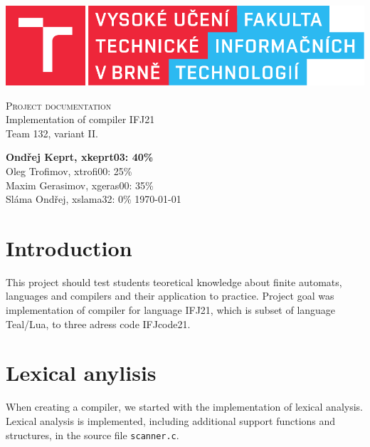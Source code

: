 \documentclass[11pt]{article}
\begin{document}
\begin{titlepage}
    \begin{center}
        \includegraphics[scale=0.8]{pics/fitlogo.pdf} \\

        
        \textsc{\Huge Project documentation}\\
        \LARGE
            Implementation of compiler IFJ21    \\
            Team 132, variant II.
    \end{center}

    \noindent\textbf{Ondřej Keprt, xkeprt03: 40\%}\\
    Oleg Trofimov, xtrofi00: 25\%    \\
    Maxim Gerasimov, xgeras00: 35\%  \\
    Sláma Ondřej, xslama32: 0\%   \hfill    \today

\end{titlepage}

\newpage
\tableofcontents
\thispagestyle{empty}
\newpage
\setcounter{page}{1}


\section*{Introduction}
This project should test students teoretical knowledge about finite automats, languages and compilers and their application to practice. Project goal was implementation of compiler
for language IFJ21, which is subset of language Teal/Lua, to three adress code IFJcode21.

\section{Lexical anylisis}
When creating a compiler, we started with the implementation of lexical analysis. Lexical analysis is implemented, including additional support functions and structures, in the source file \texttt{scanner.c}. 
\end{document}
